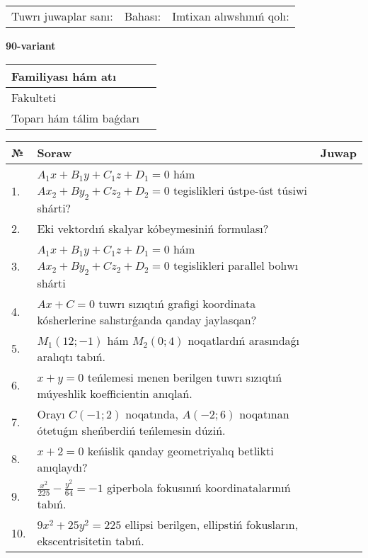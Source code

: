 \documentclass{article}
\begin{document}
\vspace{1cm}

\begin{tabular}{lll}
Tuwrı juwaplar sanı: \underline{\hspace{1.5cm}} & 
Bahası: \underline{\hspace{1.5cm}} & 
Imtixan alıwshınıń qolı: \underline{\hspace{2cm}} \\
\end{tabular}

\egroup

\newpage


\textbf{90-variant}\\

\bgroup
\def\arraystretch{1.6} %

\begin{tabular}{|m{5.7cm}|m{9.5cm}|}
\hline
Familiyası hám atı & \\
\hline
Fakulteti  & \\
\hline
Toparı hám tálim baǵdarı  & \\
\hline
\end{tabular}

\vspace{1cm}

\begin{tabular}{|m{0.7cm}|m{10cm}|m{4cm}|}
\hline
№ & Soraw & Juwap \\
\hline
1. & $A_1x+B_1y+C_1z+D_1=0$ hám $Ax_2+By_2+Cz_2+D_2=0$ tegislikleri ústpe-úst túsiwi shárti? &  \\
\hline
2. & Eki vektordıń skalyar kóbeymesiniń formulası? &  \\
\hline
3. & $A_1x+B_1y+C_1z+D_1=0$ hám $Ax_2+By_2+Cz_2+D_2=0$ tegislikleri parallel bolıwı shárti &  \\
\hline
4. & $Ax+C=0$ tuwrı sızıqtıń grafigi koordinata kósherlerine salıstırǵanda qanday jaylasqan? &  \\
\hline
5. & $M_{1} (12;-1)$ hám $M_{2} (0;4)$ noqatlardıń arasındaǵı aralıqtı tabıń. &  \\
\hline
6. & $x+y=0$ teńlemesi menen berilgen tuwrı sızıqtıń múyeshlik koefficientin anıqlań. &  \\
\hline
7. & Orayı $C (-1;2)$ noqatında, $A (-2;6 )$ noqatınan ótetuǵın sheńberdiń teńlemesin dúziń. &  \\
\hline
8. & $x+2=0$ keńislik qanday geometriyalıq betlikti anıqlaydı? &  \\
\hline
9. & $\frac{x^{2}}{225}-\frac{y^{2}}{64}=-1$ giperbola fokusınıń koordinatalarınıń tabıń. &  \\
\hline
10. & $9x^{2}+25y^{2}=225$ ellipsi berilgen, ellipstiń fokusların, ekscentrisitetin tabıń. &  \\
\hline
\end{tabular}
\end{document}
